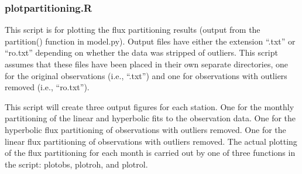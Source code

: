 \subsubsection{plot\textunderscore partitioning.R}
\label{sec:modelqpr}
This script is for plotting the flux partitioning results (output from the partition() function in model.py).  
Output files have either the extension ``.txt'' or ``\textunderscore ro.txt'' depending on whether the data was stripped of outliers.  
This script assumes that these files have been placed in their own separate directories, one for the original observations (i.e., ``.txt'') and one for observations with outliers removed (i.e., ``\textunderscore ro.txt'').

This script will create three output figures for each station.  
One for the monthly partitioning of the linear and hyperbolic fits to the observation data.  
One for the hyperbolic flux partitioning of observations with outliers removed. 
One for the linear flux partitioning of observations with outliers removed. 
The actual plotting of the flux partitioning for each month is carried out by one of three functions in the script: plot\textunderscore obs, plot\textunderscore ro\textunderscore h, and plot\textunderscore ro\textunderscore l. 

